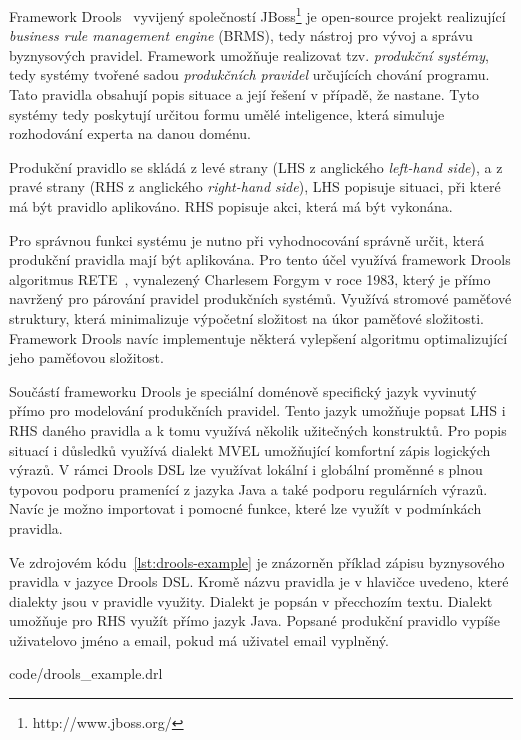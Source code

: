 Framework Drools~\cite{drools} vyvijený společností JBoss\footnote{http://www.jboss.org/}
je open-source projekt realizující \textit{business rule management engine} (\gls{BRMS}),
tedy nástroj pro vývoj a správu byznysových pravidel. Framework umožňuje realizovat
tzv. \textit{produkční systémy}, tedy systémy tvořené sadou \textit{produkčních pravidel}
určujících chování programu. Tato pravidla obsahují popis situace a její řešení v případě,
že nastane. Tyto systémy tedy poskytují určitou formu umělé inteligence, která simuluje
rozhodování experta na danou doménu.

Produkční pravidlo se skládá z levé strany (\gls{LHS} z anglického \textit{left-hand side}),
a z pravé strany (\gls{RHS} z anglického \textit{right-hand side}),
\gls{LHS} popisuje situaci, při které má být pravidlo aplikováno. \gls{RHS} popisuje akci,
která má být vykonána.

Pro správnou funkci systému je nutno při vyhodnocování správně určit, která produkční pravidla
mají být aplikována. Pro tento účel využívá framework Drools algoritmus RETE~\cite{forgy1988rete},
vynalezený Charlesem Forgym v roce 1983, který je přímo navržený pro párování pravidel produkčních systémů.
Využívá stromové paměťové struktury, která minimalizuje výpočetní složitost na úkor paměťové složitosti. Framework
Drools navíc implementuje některá vylepšení algoritmu optimalizující jeho paměťovou složitost.

Součástí frameworku Drools je speciální doménově specifický jazyk vyvinutý přímo
pro modelování produkčních pravidel. Tento jazyk umožňuje popsat \gls{LHS} i \gls{RHS}
daného pravidla a k tomu využívá několik užitečných konstruktů. Pro popis situací i důsledků
využívá dialekt MVEL umožňující komfortní zápis logických výrazů. V rámci Drools \gls{DSL}
lze využívat lokální i globální proměnné s plnou typovou podporu pramenící z jazyka Java a také
podporu regulárních výrazů. Navíc je možno importovat i pomocné funkce, které lze
využít v podmínkách pravidla.

Ve zdrojovém kódu~\ref{lst:drools-example} je znázorněn příklad zápisu
byznysového pravidla v jazyce Drools DSL. Kromě názvu pravidla je v hlavičce
uvedeno, které dialekty jsou v pravidle využity. Dialekt  je popsán v přecchozím textu.
Dialekt  umožňuje pro \gls{RHS} využít přímo jazyk Java. Popsané produkční pravidlo
vypíše uživatelovo jméno a email, pokud má uživatel email vyplněný.


{code/drools_example.drl}

